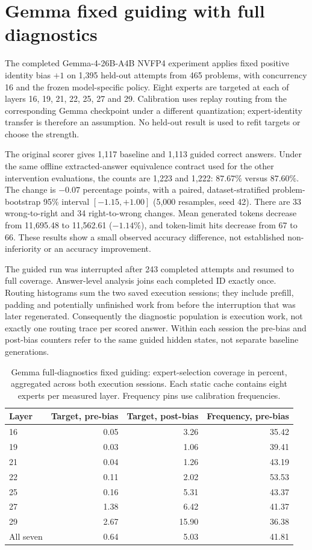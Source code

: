 \section{Gemma fixed guiding with full diagnostics}
\label{sec:gemma-cache-diagnostics}

The completed Gemma-4-26B-A4B NVFP4 experiment applies fixed positive
identity bias $+1$ on 1,395 held-out attempts from 465 problems, with
concurrency 16 and the frozen model-specific policy. Eight experts are
targeted at each of layers 16, 19, 21, 22, 25, 27 and 29. Calibration
uses replay routing from the corresponding Gemma checkpoint under a
different quantization; expert-identity transfer is therefore an assumption.
No held-out result is used to refit targets or choose the strength.

The original scorer gives 1,117 baseline and 1,113 guided correct answers.
Under the same offline extracted-answer equivalence contract used for
the other intervention evaluations, the counts are 1,223 and 1,222:
$87.67\%$ versus $87.60\%$. The change is $-0.07$ percentage points,
with a paired, dataset-stratified problem-bootstrap 95\% interval
$[-1.15,+1.00]$ (5,000 resamples, seed 42). There are 33 wrong-to-right
and 34 right-to-wrong changes. Mean generated tokens decrease from
11,695.48 to 11,562.61 ($-1.14\%$), and token-limit hits decrease from
67 to 66. These results show a small observed accuracy difference,
not established non-inferiority or an accuracy improvement.

The guided run was interrupted after 243 completed attempts and resumed
to full coverage. Answer-level analysis joins each completed ID exactly
once. Routing histograms sum the two saved execution sessions; they
include prefill, padding and potentially unfinished work from before the
interruption that was later regenerated. Consequently the diagnostic
population is execution work, not exactly one routing trace per scored
answer. Within each session the pre-bias and post-bias counters refer
to the same guided hidden states, not separate baseline generations.

\begin{table}[ht]
\centering\small
\caption{Gemma full-diagnostics fixed guiding: expert-selection coverage
in percent, aggregated across both execution sessions. Each static cache
contains eight experts per measured layer. Frequency pins use calibration
frequencies.}
\label{tab:gemma-cache-coverage}
\begin{tabular}{lrrr}
\toprule
Layer & Target, pre-bias & Target, post-bias & Frequency, pre-bias \\
\midrule
16 & 0.05 & 3.26 & 35.42 \\
19 & 0.03 & 1.06 & 39.41 \\
21 & 0.04 & 1.26 & 43.19 \\
22 & 0.11 & 2.02 & 53.53 \\
25 & 0.16 & 5.31 & 43.37 \\
27 & 1.38 & 6.42 & 41.37 \\
29 & 2.67 & 15.90 & 36.38 \\
All seven & 0.64 & 5.03 & 41.81 \\
\bottomrule
\end{tabular}
\end{table}

